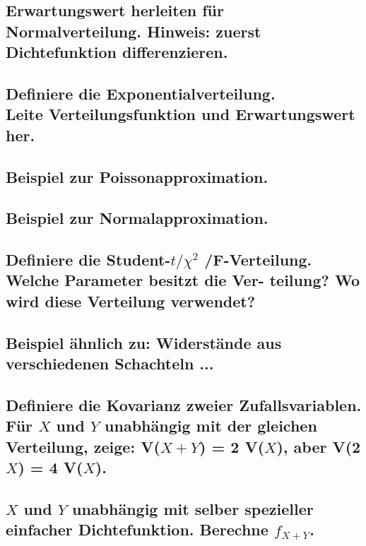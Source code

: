 \documentclass[a4paper,10pt]{article}
\begin{document}
\subsection{Erwartungswert herleiten für Normalverteilung. Hinweis: zuerst Dichtefunktion differenzieren.}

\subsection{Definiere die Exponentialverteilung. \\ Leite Verteilungsfunktion und Erwartungswert her.}

\subsection{Beispiel zur Poissonapproximation.}

\subsection{Beispiel zur Normalapproximation.}

\subsection{Definiere die Student-$t /\chi^2$ /F-Verteilung. Welche Parameter besitzt die Ver-
teilung? Wo wird diese Verteilung verwendet?}

\subsection{Beispiel ähnlich zu: Widerstände aus verschiedenen Schachteln ...}

\subsection{Definiere die Ko\-varianz zweier Zufalls\-variablen. \\ Für $X$ und $Y$ un\-abhängig mit der gleichen Ver\-teilung, zeige: V($X + Y$) = 2 V($X$), aber V(2$X$) = 4 V($X$).}

\subsection{$X$ und $Y$ unabhängig mit selber spezieller einfacher Dichtefunktion. Berechne $f_{X + Y}$.}

\newpage
\end{document}
